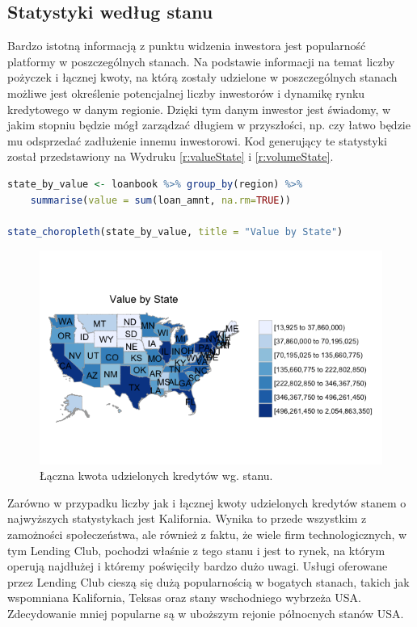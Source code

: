 \subsection{Statystyki według stanu}

Bardzo istotną informacją z punktu widzenia inwestora jest popularność platformy w poszczególnych stanach. Na podstawie informacji na temat liczby pożyczek i łącznej kwoty, na którą zostały udzielone w poszczególnych stanach możliwe jest określenie potencjalnej liczby inwestorów i dynamikę rynku kredytowego w danym regionie. Dzięki tym danym inwestor jest świadomy, w jakim stopniu będzie mógł zarządzać długiem w przyszłości, np. czy łatwo będzie mu odsprzedać zadłużenie innemu inwestorowi. Kod generujący te statystyki został przedstawiony na Wydruku \ref{r:valueState} i \ref{r:volumeState}.

\begin{lstlisting}[language=R, caption={Skrypt wyliczający łączną kwotę udzielonych kredytów dla każdego stanu}, label={r:valueState}]
state_by_value <- loanbook %>% group_by(region) %>% 
	summarise(value = sum(loan_amnt, na.rm=TRUE))

state_choropleth(state_by_value, title = "Value by State")
\end{lstlisting}

\begin{figure}[h] \centering %
	\includegraphics[scale=0.7]{img/value_state.png}
	\caption{Łączna kwota udzielonych kredytów wg. stanu.}
	\label{lc:value_state}
\end{figure}

Zarówno w przypadku liczby jak i łącznej kwoty udzielonych kredytów stanem o najwyższych statystykach jest Kalifornia. Wynika to przede wszystkim z zamożności społeczeństwa, ale również z faktu, że wiele firm technologicznych, w tym Lending Club, pochodzi właśnie z tego stanu i jest to rynek, na którym operują najdłużej i któremy poświęciły bardzo dużo uwagi. Usługi oferowane przez Lending Club cieszą się dużą popularnością w bogatych stanach, takich jak wspomniana Kalifornia, Teksas oraz stany wschodniego wybrzeża USA. Zdecydowanie mniej popularne są w uboższym rejonie północnych stanów USA. 

